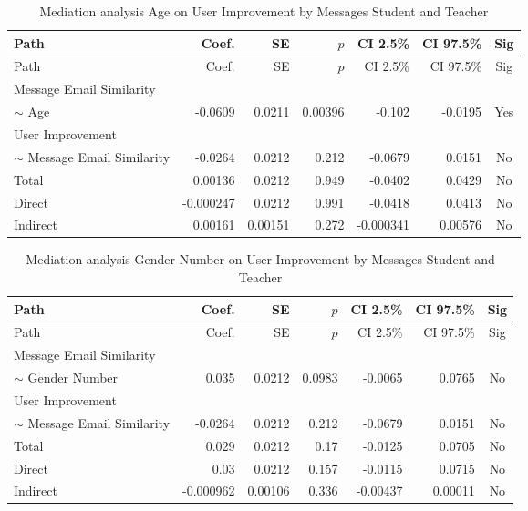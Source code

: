 \begin{longtable}{lrrrrrc}
            \caption{Mediation analysis Age on User Improvement by  Messages Student and Teacher}\label{tab:mediation Age on User Improvement by  Messages Student and Teacher}\\
            \toprule
            Path & Coef. & SE & $p$ & CI 2.5\% & CI 97.5\% & Sig \\
            \midrule
            \endfirsthead
            \toprule
            Path & Coef. & SE & $p$ & CI 2.5\% & CI 97.5\% & Sig \\
            \midrule
            \endhead
            \bottomrule
            \endfoot
            Message Email Similarity\\ $\sim$ Age & -0.0609 & 0.0211 & 0.00396 & -0.102 & -0.0195 & Yes \\
User Improvement\\ $\sim$ Message Email Similarity & -0.0264 & 0.0212 & 0.212 & -0.0679 & 0.0151 & No \\
Total & 0.00136 & 0.0212 & 0.949 & -0.0402 & 0.0429 & No \\
Direct & -0.000247 & 0.0212 & 0.991 & -0.0418 & 0.0413 & No \\
Indirect & 0.00161 & 0.00151 & 0.272 & -0.000341 & 0.00576 & No \\
\end{longtable}

\begin{longtable}{lrrrrrc}
            \caption{Mediation analysis Gender Number on User Improvement by  Messages Student and Teacher}\label{tab:mediation Gender Number on User Improvement by  Messages Student and Teacher}\\
            \toprule
            Path & Coef. & SE & $p$ & CI 2.5\% & CI 97.5\% & Sig \\
            \midrule
            \endfirsthead
            \toprule
            Path & Coef. & SE & $p$ & CI 2.5\% & CI 97.5\% & Sig \\
            \midrule
            \endhead
            \bottomrule
            \endfoot
            Message Email Similarity\\ $\sim$ Gender Number & 0.035 & 0.0212 & 0.0983 & -0.0065 & 0.0765 & No \\
User Improvement\\ $\sim$ Message Email Similarity & -0.0264 & 0.0212 & 0.212 & -0.0679 & 0.0151 & No \\
Total & 0.029 & 0.0212 & 0.17 & -0.0125 & 0.0705 & No \\
Direct & 0.03 & 0.0212 & 0.157 & -0.0115 & 0.0715 & No \\
Indirect & -0.000962 & 0.00106 & 0.336 & -0.00437 & 0.00011 & No \\
\end{longtable}

